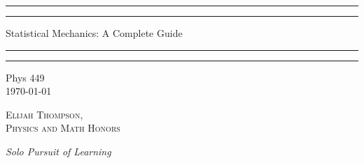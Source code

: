 \documentclass[12pt, a4paper, oneside, openright, titlepage]{book}
\begin{document}

\begin{titlepage}
    \centering
    \scshape
    \vspace*{\baselineskip}
    \rule{\textwidth}{1.6pt}\vspace*{-\baselineskip}\vspace*{2pt}
    \rule{\textwidth}{0.4pt}
    
    \vspace{0.75\baselineskip}
    
    {\LARGE Statistical Mechanics: A Complete Guide}
    
    \vspace{0.75\baselineskip}
    
    \rule{\textwidth}{0.4pt}\vspace*{-\baselineskip}\vspace{3.2pt}
    \rule{\textwidth}{1.6pt}
    
    \vspace{2\baselineskip}
    Phys 449 \\
    \vspace*{3\baselineskip}
    \monthdayyeardate\today \\
    \vspace*{5.0\baselineskip}
    
    {\scshape\Large Elijah Thompson, \\ Physics and Math Honors\\}
    
    \vspace{1.0\baselineskip}
    \textit{Solo Pursuit of Learning}
    \vfill
    \enlargethispage{1in}
    \begin{figure}[b!]
    \end{figure}
\end{titlepage}
\end{document}
